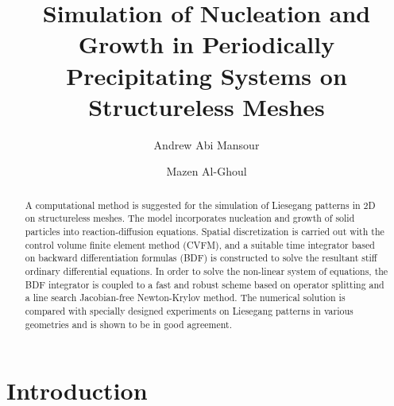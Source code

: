 \documentclass[aps,preprint]{revtex4}
\begin{document}
\title{Simulation of Nucleation and Growth in Periodically Precipitating Systems on
Structureless Meshes}
\author{Andrew Abi Mansour}
\author{Mazen Al-Ghoul}

\begin{abstract}
A computational method is suggested for the simulation of Liesegang
patterns in 2D on structureless meshes. The model incorporates nucleation and
growth of solid particles into reaction-diffusion equations. Spatial
discretization is carried out with the control volume finite element method (CVFM),
and a suitable time integrator based on backward differentiation formulas (BDF) is
constructed to solve the resultant stiff ordinary differential equations.  In
order to solve the non-linear system of equations, the
BDF integrator is coupled to a fast and robust scheme based on operator
splitting and a line search Jacobian-free Newton-Krylov method. The numerical solution is
compared with specially designed experiments on Liesegang patterns in various geometries 
and is shown to be in good agreement.
\end{abstract}
\maketitle


\section{Introduction}
\end{document}
